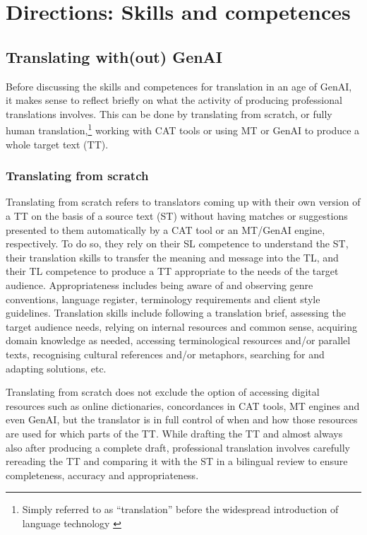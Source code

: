 \documentclass[output=paper]{langscibook}
\begin{document}
\section{Directions: Skills and competences}\label{sec:1:3}
\subsection{Translating with(out) GenAI}\label{sec:1:3.1}

Before discussing the skills and competences for translation in an age of GenAI, it makes sense to reflect briefly on what the activity of producing professional translations involves. This can be done by translating from scratch, or fully human translation,\footnote{{Simply referred to as ``translation'' before the widespread introduction of language technology \citep{christensen_mapping_2017}}} working with CAT tools or using MT or GenAI to produce a whole target text (TT).

\subsubsection{Translating from scratch}

Translating from scratch refers to translators coming up with their own version of a TT on the basis of a source text (ST) without having matches or suggestions presented to them automatically by a CAT tool or an MT/GenAI engine, respectively. To do so, they rely on their SL competence to understand the ST, their translation skills to transfer the meaning and message into the TL, and their TL competence to produce a TT appropriate to the needs of the target audience. Appropriateness includes being aware of and observing genre conventions, language register, terminology requirements and client style guidelines. Translation skills include following a translation brief, assessing the target audience needs, relying on internal resources and common sense, acquiring domain knowledge as needed, accessing terminological resources and/or parallel texts, recognising cultural references and/or metaphors, searching for and adapting solutions, etc. 

Translating from scratch does not exclude the option of accessing digital resources such as online dictionaries, concordances in CAT tools, MT engines and even GenAI, but the translator is in full control of when and how those resources are used for which parts of the TT. While drafting the TT and almost always also after producing a complete draft, professional translation involves carefully rereading the TT and comparing it with the ST in a bilingual review to ensure completeness, accuracy and appropriateness.
\end{document}
